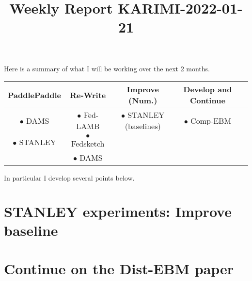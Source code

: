 \documentclass{article}
\begin{document}
\title{Weekly Report KARIMI-2022-01-21}


\date{}
\maketitle




Here is a summary of what I will be working over the next 2 months.

\begin{center}
\begin{tabular}{ |c|c|c|c|c| } 
\hline
PaddlePaddle & Re-Write & Improve (Num.)& Develop and Continue \\
\hline
$\bullet$ DAMS & $\bullet$ Fed-LAMB & $\bullet$ STANLEY (baselines) & $\bullet$ Comp-EBM\\ 
$\bullet$  STANLEY & $\bullet$ Fedsketch &  & \\ 
  & $\bullet$ DAMS &  & \\ 
\hline
\end{tabular}
\end{center}


In particular I develop several points below.

\section{STANLEY experiments: Improve baseline}

\section{Continue on the Dist-EBM paper}





\end{document}
